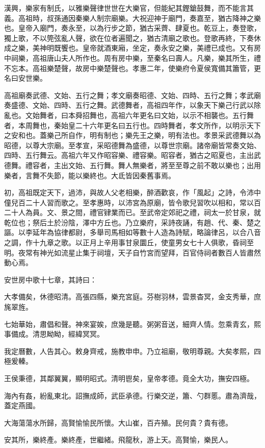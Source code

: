 \begin{pinyinscope}
漢興，樂家有制氏，以雅樂聲律世世在大樂官，但能紀其鏗鎗鼓舞，而不能言其義。高祖時，叔孫通因秦樂人制宗廟樂。大祝迎神于廟門，奏嘉至，猶古降神之樂也。皇帝入廟門，奏永至，以為行步之節，猶古采薺、肆夏也。乾豆上，奏登歌，獨上歌，不以筦弦亂人聲，欲在位者遍聞之，猶古清廟之歌也。登歌再終，下奏休成之樂，美神明既饗也。皇帝就酒東廂，坐定，奏永安之樂，美禮已成也。又有房中祠樂，高祖唐山夫人所作也。周有房中樂，至秦名曰壽人。凡樂，樂其所生，禮不忘本。高祖樂楚聲，故房中樂楚聲也。孝惠二年，使樂府令夏侯寬備其簫管，更名曰安世樂。

高祖廟奏武德、文始、五行之舞；孝文廟奏昭德、文始、四時、五行之舞；孝武廟奏盛德、文始、四時、五行之舞。武德舞者，高祖四年作，以象天下樂己行武以除亂也。文始舞者，曰本舜招舞也，高祖六年更名曰文始，以示不相襲也。五行舞者，本周舞也，秦始皇二十六年更名曰五行也。四時舞者，孝文所作，以明示天下之安和也。蓋樂己所自作，明有制也；樂先王之樂，明有法也。孝景采武德舞以為昭德，以尊大宗廟。至孝宣，采昭德舞為盛德，以尊世宗廟。諸帝廟皆常奏文始、四時、五行舞云。高祖六年又作昭容樂、禮容樂。昭容者，猶古之昭夏也，主出武德舞。禮容者，主出文始、五行舞。舞人無樂者，將至至尊之前不敢以樂也；出用樂者，言舞不失節，能以樂終也。大氐皆因秦舊事焉。

初，高祖既定天下，過沛，與故人父老相樂，醉酒歡哀，作「風起」之詩，令沛中僮兒百二十人習而歌之。至孝惠時，以沛宮為原廟，皆令歌兒習吹以相和，常以百二十人為員。文、景之間，禮官肄業而已。至武帝定郊祀之禮，祠太一於甘泉，就乾位也；祭后土於汾陰，澤中方丘也。乃立樂府，采詩夜誦，有趙、代、秦、楚之謳。以李延年為協律都尉，多舉司馬相如等數十人造為詩賦，略論律呂，以合八音之調，作十九章之歌。以正月上辛用事甘泉圜丘，使童男女七十人俱歌，昏祠至明。夜常有神光如流星止集于祠壇，天子自竹宮而望拜，百官侍祠者數百人皆肅然動心焉。

安世房中歌十七章，其詩曰：

大孝備矣，休德昭清。高張四縣，樂充宮庭。芬樹羽林，雲景杳冥，金支秀華，庶旄翠旌。

七始華始，肅倡和聲。神來宴娭，庶幾是聽。粥粥音送，細齊人情。忽乘青玄，熙事備成。清思眑眑，經緯冥冥。

我定曆數，人告其心。敕身齊戒，施教申申。乃立祖廟，敬明尊親。大矣孝熙，四極爰轃。

王侯秉德，其鄰翼翼，顯明昭式。清明鬯矣，皇帝孝德。竟全大功，撫安四極。

海內有姦，紛亂東北。詔撫成師，武臣承德。行樂交逆，簫、勺群慝。肅為濟哉，蓋定燕國。

大海蕩蕩水所歸，高賢愉愉民所懷。大山崔，百卉殖。民何貴？貴有德。

安其所，樂終產。樂終產，世繼緒。飛龍秋，游上天。高賢愉，樂民人。


\end{pinyinscope}
